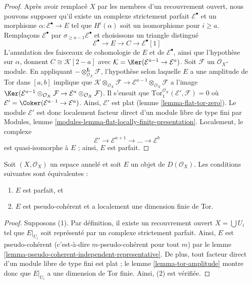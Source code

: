 {\begin{proof}
Après avoir remplacé $X$ par les membres d'un recouvrement ouvert, nous pouvons supposer qu'il existe un complexe strictement parfait $\mathcal{E}^\bullet$ et un morphisme
$\alpha : \mathcal{E}^\bullet \to E$ tel que $H^i(\alpha)$ soit un isomorphisme pour $i \geq a$. Remplaçons $\mathcal{E}^\bullet$ par
$\sigma_{\geq a - 1}\mathcal{E}^\bullet$ et choisissons un triangle distingué
$$
\mathcal{E}^\bullet \to E \to C \to \mathcal{E}^\bullet[1]
$$
L'annulation des faisceaux de cohomologie de $E$ et de $\mathcal{E}^\bullet$,
ainsi que l'hypothèse sur $\alpha$, donnent $C \cong \mathcal{K}[2 - a]$ avec
$\mathcal{K} = \Ker(\mathcal{E}^{a - 1} \to \mathcal{E}^a)$. Soit $\mathcal{F}$ un $\mathcal{O}_X$-module. En appliquant $- \otimes_{\mathcal{O}_X}^\mathbf{L} \mathcal{F}$,
l'hypothèse selon laquelle $E$ a une amplitude de Tor dans $[a, b]$
implique que $\mathcal{K} \otimes_{\mathcal{O}_X} \mathcal{F} \to
\mathcal{E}^{a - 1} \otimes_{\mathcal{O}_X} \mathcal{F}$ a l'image
$\Ker(\mathcal{E}^{a - 1} \otimes_{\mathcal{O}_X} \mathcal{F}
\to \mathcal{E}^a \otimes_{\mathcal{O}_X} \mathcal{F})$. Il s'ensuit que $\text{Tor}_1^{\mathcal{O}_X}(\mathcal{E}', \mathcal{F}) = 0$
où $\mathcal{E}' = \Coker(\mathcal{E}^{a - 1} \to \mathcal{E}^a)$. Ainsi, $\mathcal{E}'$ est plat (lemme \ref{lemma-flat-tor-zero}). Le module $\mathcal{E}'$ est donc localement facteur direct d'un module libre de type fini par Modules, lemme \ref{modules-lemma-flat-locally-finite-presentation}. Localement, le complexe
$$
\mathcal{E}' \to \mathcal{E}^{a + 1} \to \ldots \to \mathcal{E}^b
$$
est quasi-isomorphe à $E$ ; ainsi, $E$ est parfait.

\end{proof}

\begin{lemma}

\label{lemma-perfect}
Soit $(X, \mathcal{O}_X)$ un espace annelé et soit $E$ un objet de $D(\mathcal{O}_X)$. Les conditions suivantes sont équivalentes :
\begin{enumerate}
\item $E$ est parfait, et
\item $E$ est pseudo-cohérent et a localement une dimension finie de Tor.
\end{enumerate}

\end{lemma}

\begin{proof}
Supposons (1). Par définition, il existe un recouvrement ouvert $X = \bigcup U_i$ tel que $E|_{U_i}$ soit représenté par un complexe strictement parfait. Ainsi, $E$ est pseudo-cohérent (c'est-à-dire $m$-pseudo-cohérent pour tout $m$) par le lemme \ref{lemma-pseudo-coherent-independent-representative}. De plus, tout facteur direct d'un module libre de type fini est plat ; le lemme \ref{lemma-tor-amplitude} montre donc que $E|_{U_i}$ a une dimension de Tor finie. Ainsi, (2) est vérifiée.


\end{proof}}
